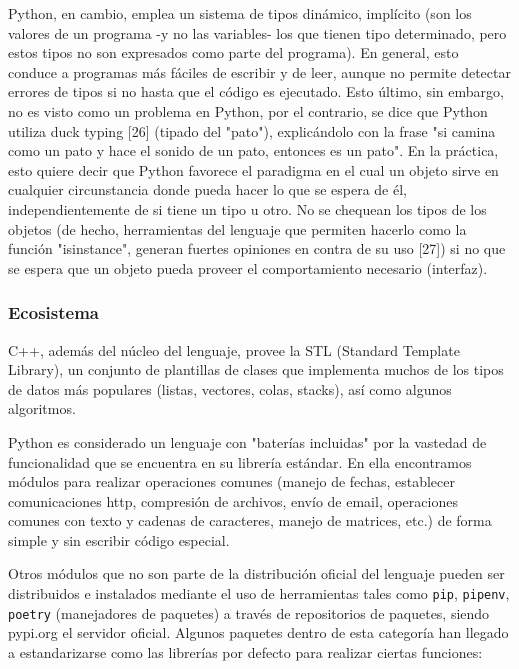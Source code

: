 \documentclass[]{article}
\begin{document}
Python, en cambio, emplea un sistema de tipos dinámico, implícito (son los
valores de un programa -y no las variables- los que tienen tipo determinado,
pero estos tipos no son expresados como parte del programa). En general, esto
conduce a programas más fáciles de escribir y de leer, aunque no permite
detectar errores de tipos si no hasta que el código es ejecutado. Esto último,
sin embargo, no es visto como un problema en Python, por el contrario, se dice
que Python utiliza duck typing [26] (tipado del "pato"), explicándolo con la
frase "si camina como un pato y hace el sonido de un pato, entonces es un
pato". En la práctica, esto quiere decir que Python favorece el paradigma en el
cual un objeto sirve en cualquier circunstancia donde pueda hacer lo que se
espera de él, independientemente de si tiene un tipo u otro. No se chequean los
tipos de los objetos (de hecho, herramientas del lenguaje que permiten hacerlo
como la función "isinstance", generan fuertes opiniones en contra de su uso
[27]) si no que se espera que un objeto pueda proveer el comportamiento
necesario (interfaz).

\subsubsection{Ecosistema}

C++, además del núcleo del lenguaje, provee la STL (Standard Template Library),
un conjunto de plantillas de clases que implementa muchos de los tipos de datos
más populares (listas, vectores, colas, stacks), así como algunos algoritmos. 

Python es considerado un lenguaje con "baterías incluidas" por la vastedad de
funcionalidad que se encuentra en su librería estándar. En ella encontramos
módulos para realizar operaciones comunes (manejo de fechas, establecer
comunicaciones http, compresión de archivos, envío de email, operaciones
comunes con texto y cadenas de caracteres, manejo de matrices, etc.) de forma
simple y sin escribir código especial.

Otros módulos que no son parte de la distribución oficial del lenguaje pueden
ser distribuidos e instalados mediante el uso de herramientas tales como
\verb!pip!, \verb!pipenv!, \verb!poetry! (manejadores de paquetes) a través de
repositorios de paquetes, siendo pypi.org el servidor oficial. Algunos paquetes
dentro de esta categoría han llegado a estandarizarse como las librerías por
defecto para realizar ciertas funciones:

\end{document}
